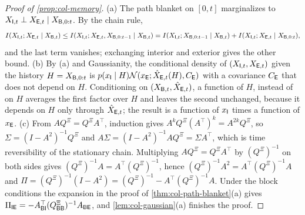 \begin{proof}[Proof of \cref{prop:col-memory}]
(a) The path blanket on $[0,t]$ marginalizes to $X_{\mathsf{I},t}\perp X_{\mathsf{E},t}\mid X_{\mathsf{B},0:t}$. By the chain rule,
\[
I(X_{\mathsf{I},t};X_{\mathsf{E},t}\mid X_{\mathsf{B},t})\le I(X_{\mathsf{I},t};X_{\mathsf{E},t},X_{\mathsf{B},0:t-1}\mid X_{\mathsf{B},t})=I(X_{\mathsf{I},t};X_{\mathsf{B},0:t-1}\mid X_{\mathsf{B},t})+I(X_{\mathsf{I},t};X_{\mathsf{E},t}\mid X_{\mathsf{B},0:t}),
\]
and the last term vanishes; exchanging interior and exterior gives the other bound. (b) By (a) and Gaussianity, the conditional density of $(X_{\mathsf{I},t},X_{\mathsf{E},t})$ given the history $H=X_{\mathsf{B},0:t}$ is $p(x_{\mathsf{I}}\mid H)\mathcal{N}(x_{\mathsf{E}};\hat X_{\mathsf{E},t}(H),C_{\mathsf{E}})$ with a covariance $C_{\mathsf{E}}$ that does not depend on $H$. Conditioning on $(X_{\mathsf{B},t},\hat X_{\mathsf{E},t})$, a function of $H$, instead of on $H$ averages the first factor over $H$ and leaves the second unchanged, because it depends on $H$ only through $\hat X_{\mathsf{E},t}$; the result is a function of $x_{\mathsf{I}}$ times a function of $x_{\mathsf{E}}$. (c) From $AQ^{\Xi}=Q^{\Xi}A^\top$, induction gives $A^kQ^{\Xi}(A^\top)^k=A^{2k}Q^{\Xi}$, so $\Sigma=(I-A^2)^{-1}Q^{\Xi}$ and $A\Sigma=(I-A^2)^{-1}AQ^{\Xi}=\Sigma A^\top$, which is time reversibility of the stationary chain. Multiplying $AQ^{\Xi}=Q^{\Xi}A^\top$ by $(Q^{\Xi})^{-1}$ on both sides gives $(Q^{\Xi})^{-1}A=A^\top(Q^{\Xi})^{-1}$, hence $(Q^{\Xi})^{-1}A^2=A^\top(Q^{\Xi})^{-1}A$ and $\Pi=(Q^{\Xi})^{-1}(I-A^2)=(Q^{\Xi})^{-1}-A^\top(Q^{\Xi})^{-1}A$. Under the block conditions the expansion in the proof of \cref{thm:col-path-blanket}(a) gives $\Pi_{\mathsf{I}\mathsf{E}}=-A_{\mathsf{B}\mathsf{I}}^\top(Q^{\Xi}_{\mathsf{B}\mathsf{B}})^{-1}A_{\mathsf{B}\mathsf{E}}$, and \cref{lem:col-gaussian}(a) finishes the proof.
\end{proof}

